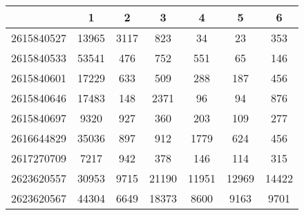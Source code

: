 \begin{adjustbox}{center}
\begin{tabular}{|l||c|c|c|c|c|c|}
\hline
& 1 & 2 & 3 & 4 & 5 & 6 \\
\hline
\hline
2615840527 & \cellcolor[RGB]{235, 71, 71} 13965 & \cellcolor[RGB]{235, 71, 71} 3117 & \cellcolor[RGB]{253, 241, 241} 823 & \cellcolor[RGB]{227, 227, 252} 34 & \cellcolor[RGB]{223, 223, 251} 23 & \cellcolor[RGB]{241, 241, 253} 353 \\
\hline
2615840533 & \cellcolor[RGB]{235, 71, 71} 53541 & \cellcolor[RGB]{250, 250, 254} 476 & \cellcolor[RGB]{251, 223, 223} 752 & \cellcolor[RGB]{254, 250, 250} 551 & \cellcolor[RGB]{214, 214, 250} 65 & \cellcolor[RGB]{218, 218, 251} 146 \\
\hline
2615840601 & \cellcolor[RGB]{235, 71, 71} 17229 & \cellcolor[RGB]{251, 218, 218} 633 & \cellcolor[RGB]{254, 250, 250} 509 & \cellcolor[RGB]{223, 223, 251} 288 & \cellcolor[RGB]{205, 205, 249} 187 & \cellcolor[RGB]{250, 250, 254} 456 \\
\hline
2615840646 & \cellcolor[RGB]{235, 71, 71} 17483 & \cellcolor[RGB]{232, 232, 252} 148 & \cellcolor[RGB]{235, 71, 71} 2371 & \cellcolor[RGB]{232, 232, 252} 96 & \cellcolor[RGB]{232, 232, 252} 94 & \cellcolor[RGB]{252, 232, 232} 876 \\
\hline
2615840697 & \cellcolor[RGB]{235, 71, 71} 9320 & \cellcolor[RGB]{235, 71, 71} 927 & \cellcolor[RGB]{253, 241, 241} 360 & \cellcolor[RGB]{223, 223, 251} 203 & \cellcolor[RGB]{200, 200, 249} 109 & \cellcolor[RGB]{246, 246, 254} 277 \\
\hline
2616644829 & \cellcolor[RGB]{235, 71, 71} 35036 & \cellcolor[RGB]{255, 255, 255} 897 & \cellcolor[RGB]{255, 255, 255} 912 & \cellcolor[RGB]{235, 71, 71} 1779 & \cellcolor[RGB]{218, 218, 251} 624 & \cellcolor[RGB]{195, 195, 248} 456 \\
\hline
2617270709 & \cellcolor[RGB]{235, 71, 71} 7217 & \cellcolor[RGB]{235, 71, 71} 942 & \cellcolor[RGB]{254, 246, 246} 378 & \cellcolor[RGB]{223, 223, 251} 146 & \cellcolor[RGB]{218, 218, 251} 114 & \cellcolor[RGB]{250, 250, 254} 315 \\
\hline
2623620557 & \cellcolor[RGB]{235, 71, 71} 30953 & \cellcolor[RGB]{186, 186, 247} 9715 & \cellcolor[RGB]{235, 71, 71} 21190 & \cellcolor[RGB]{227, 227, 252} 11951 & \cellcolor[RGB]{241, 241, 253} 12969 & \cellcolor[RGB]{253, 241, 241} 14422 \\
\hline
2623620567 & \cellcolor[RGB]{235, 71, 71} 44304 & \cellcolor[RGB]{94, 94, 237} 6649 & \cellcolor[RGB]{235, 71, 71} 18373 & \cellcolor[RGB]{223, 223, 251} 8600 & \cellcolor[RGB]{246, 246, 254} 9163 & \cellcolor[RGB]{253, 241, 241} 9701 \\

\end{tabular}
\end{adjustbox}
